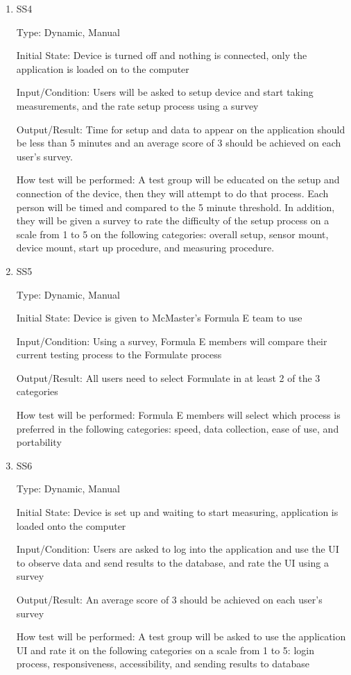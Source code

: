 \documentclass[12pt, titlepage]{article}
\begin{document}
\begin{enumerate}

\item{SS4\\}

Type: Dynamic, Manual
          
Initial State: Device is turned off and nothing is connected, only the application is loaded on to the computer
          
Input/Condition: Users will be asked to setup device and start taking measurements, and the rate setup process using a survey
          
Output/Result: Time for setup and data to appear on the application should be less than 5 minutes and an average score of 3 should be achieved on each user's survey.
          
How test will be performed: A test group will be educated on the setup and connection of the device, then they will attempt to do that process. 
Each person will be timed and compared to the 5 minute threshold. In addition, they will be given a survey to rate the difficulty of the setup process on a scale from 
1 to 5 on the following categories: overall setup, sensor mount, device mount, start up procedure, and measuring procedure.  

\item{SS5\\}

Type: Dynamic, Manual
					
Initial State: Device is given to McMaster's Formula E team to use
					
Input/Condition: Using a survey, Formula E members will compare their current testing process to the Formulate process
					
Output/Result: All users need to select Formulate in at least 2 of the 3 categories
					
How test will be performed: Formula E members will select which process is preferred in the following categories: speed, data collection, ease of use, and portability

\item{SS6\\}

Type: Dynamic, Manual
					
Initial State: Device is set up and waiting to start measuring, application is loaded onto the computer
					
Input/Condition: Users are asked to log into the application and use the UI to observe data and send results to the database, and rate the UI using a survey
					
Output/Result: An average score of 3 should be achieved on each user's survey
					
How test will be performed: A test group will be asked to use the application UI and rate it on the following categories on a scale from 1 to 5: login process, responsiveness, accessibility, and sending results to database 

\end{enumerate}
\end{document}
